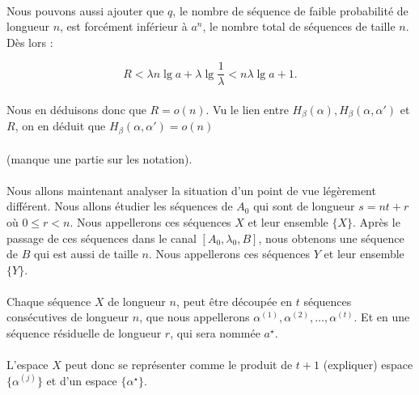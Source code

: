 	\paragraph{}
	Nous pouvons aussi ajouter que $q$, le nombre de séquence de faible 
	probabilité de longueur $n$, est forcément inférieur à $a^n$, le 
	nombre total de séquences de taille $n$.
	Dès lors :
	
	\[R<\lambda n\lg a +\lambda \lg \frac{1}{\lambda}<n\lambda\lg a+1.\]
	
	\paragraph{}
	Nous en déduisons donc que $R=o(n)$. Vu le lien entre 
	$H_\beta(\alpha),H_\beta(\alpha,\alpha')$ et $R$, 
	on en déduit que $H_\beta(\alpha,\alpha')=o(n)$
	
	\paragraph{}
	(manque une partie sur les notation).
	
	\paragraph{}
	Nous allons maintenant analyser la situation d'un point de vue 
	légèrement différent. Nous allons étudier les séquences de $A_0$ qui sont
	de longueur $s = nt+r$ où $0\le r < n$. Nous appellerons ces séquences 
	$X$ et leur ensemble $\{X\}$. Après le passage de ces séquences dans le 
	canal $[A_0,\lambda_0,B]$, nous obtenons une séquence de $B$ qui est aussi
	de taille $n$. Nous appellerons ces séquences $Y$ et 
	leur ensemble $\{Y\}$.
	
	\paragraph{}
	Chaque séquence $X$ de longueur $n$, peut être découpée en $t$ séquences 
	consécutives de longueur $n$, que nous appellerons 
	$\alpha^{(1)}, \alpha^{(2)}, \dots, \alpha^{(t)}$.
	Et en une séquence résiduelle de longueur $r$, qui sera nommée $a^\star$.
	
	\paragraph{}
	L'espace ${X}$ peut donc se représenter comme le produit de $t+1$ 
	(expliquer) espace $\{\alpha^{(j)}\}$ et d'un espace 
	$\{\alpha^\star\}$.
	
